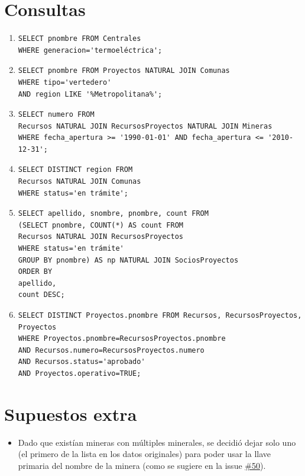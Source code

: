 \documentclass{article}
\begin{document}
\section{Consultas}

\begin{enumerate}
	\item \begin{verbatim}
SELECT pnombre FROM Centrales
WHERE generacion='termoeléctrica';
\end{verbatim}

\item \begin{verbatim}
SELECT pnombre FROM Proyectos NATURAL JOIN Comunas 
WHERE tipo='vertedero'
AND region LIKE '%Metropolitana%';
\end{verbatim}

\item \begin{verbatim}
SELECT numero FROM 
Recursos NATURAL JOIN RecursosProyectos NATURAL JOIN Mineras
WHERE fecha_apertura >= '1990-01-01' AND fecha_apertura <= '2010-12-31';
\end{verbatim}

\item \begin{verbatim}
SELECT DISTINCT region FROM
Recursos NATURAL JOIN Comunas
WHERE status='en trámite';
\end{verbatim}

\item \begin{verbatim}
SELECT apellido, snombre, pnombre, count FROM
(SELECT pnombre, COUNT(*) AS count FROM
Recursos NATURAL JOIN RecursosProyectos
WHERE status='en trámite'
GROUP BY pnombre) AS np NATURAL JOIN SociosProyectos 
ORDER BY 
apellido,
count DESC;
\end{verbatim}

\item \begin{verbatim}
SELECT DISTINCT Proyectos.pnombre FROM Recursos, RecursosProyectos, Proyectos 
WHERE Proyectos.pnombre=RecursosProyectos.pnombre 
AND Recursos.numero=RecursosProyectos.numero
AND Recursos.status='aprobado'
AND Proyectos.operativo=TRUE;
\end{verbatim}

\end{enumerate}

\section{Supuestos extra}
\begin{itemize}
	\item Dado que existían mineras con múltiples minerales, se decidió dejar solo uno (el primero de la lista en los datos originales) para poder usar la llave primaria del nombre de la minera (como se sugiere en la issue \href{https://github.com/IIC2413/Syllabus-2019-2/issues/50}{\#50}).
\end{itemize}
\end{document}

